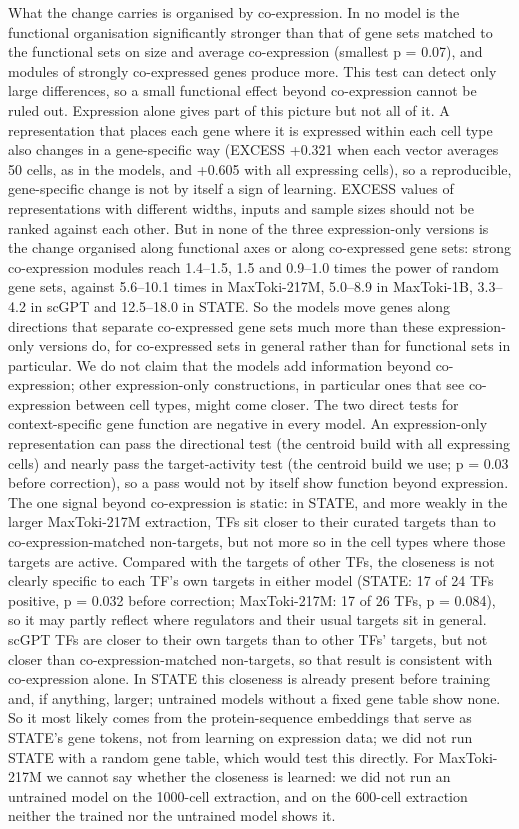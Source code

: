 \documentclass[
  11pt,
]{article}
\newcounter{none} %
\begin{document}
What the change carries is organised by co-expression. In no model is
the functional organisation significantly stronger than that of gene
sets matched to the functional sets on size and average co-expression
(smallest p = 0.07), and modules of strongly co-expressed genes produce
more. This test can detect only large differences, so a small functional
effect beyond co-expression cannot be ruled out. Expression alone gives
part of this picture but not all of it. A representation that places
each gene where it is expressed within each cell type also changes in a
gene-specific way (EXCESS +0.321 when each vector averages 50 cells, as
in the models, and +0.605 with all expressing cells), so a reproducible,
gene-specific change is not by itself a sign of learning. EXCESS values
of representations with different widths, inputs and sample sizes should
not be ranked against each other. But in none of the three
expression-only versions is the change organised along functional axes
or along co-expressed gene sets: strong co-expression modules reach
1.4--1.5, 1.5 and 0.9--1.0 times the power of random gene sets, against
5.6--10.1 times in MaxToki-217M, 5.0--8.9 in MaxToki-1B, 3.3--4.2 in
scGPT and 12.5--18.0 in STATE. So the models move genes along directions
that separate co-expressed gene sets much more than these
expression-only versions do, for co-expressed sets in general rather
than for functional sets in particular. We do not claim that the models
add information beyond co-expression; other expression-only
constructions, in particular ones that see co-expression between cell
types, might come closer. The two direct tests for context-specific gene
function are negative in every model. An expression-only representation
can pass the directional test (the centroid build with all expressing
cells) and nearly pass the target-activity test (the centroid build we
use; p = 0.03 before correction), so a pass would not by itself show
function beyond expression. The one signal beyond co-expression is
static: in STATE, and more weakly in the larger MaxToki-217M extraction,
TFs sit closer to their curated targets than to co-expression-matched
non-targets, but not more so in the cell types where those targets are
active. Compared with the targets of other TFs, the closeness is not
clearly specific to each TF's own targets in either model (STATE: 17 of
24 TFs positive, p = 0.032 before correction; MaxToki-217M: 17 of 26
TFs, p = 0.084), so it may partly reflect where regulators and their
usual targets sit in general. scGPT TFs are closer to their own targets
than to other TFs' targets, but not closer than co-expression-matched
non-targets, so that result is consistent with co-expression alone. In
STATE this closeness is already present before training and, if
anything, larger; untrained models without a fixed gene table show none.
So it most likely comes from the protein-sequence embeddings that serve
as STATE's gene tokens, not from learning on expression data; we did not
run STATE with a random gene table, which would test this directly. For
MaxToki-217M we cannot say whether the closeness is learned: we did not
run an untrained model on the 1000-cell extraction, and on the 600-cell
extraction neither the trained nor the untrained model shows it.
\end{document}

